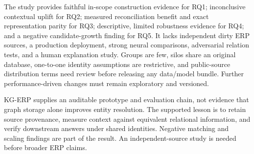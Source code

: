 \documentclass[conference]{IEEEtran}
\newcommand{\artifact}{KG-ERP}
\begin{document}
The study provides faithful in-scope construction evidence for RQ1; inconclusive contextual uplift for RQ2; measured reconciliation benefit and exact representation parity for RQ3; descriptive, limited robustness evidence for RQ4; and a negative candidate-growth finding for RQ5. It lacks independent dirty ERP sources, a production deployment, strong neural comparisons, adversarial relation tests, and a human explanation study. Groups are few, silos share an original database, one-to-one identity assumptions are restrictive, and public-source distribution terms need review before releasing any data/model bundle. Further performance-driven changes must remain exploratory and versioned.

\artifact{} supplies an auditable prototype and evaluation chain, not evidence that graph storage alone improves entity resolution. The supported lesson is to retain source provenance, measure context against equivalent relational information, and verify downstream answers under shared identities. Negative matching and scaling findings are part of the result. An independent-source study is needed before broader ERP claims.



\end{document}
